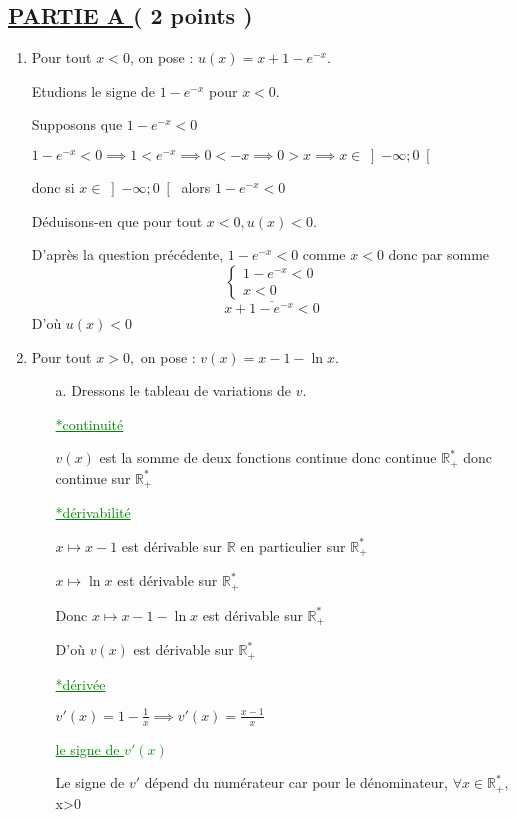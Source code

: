 \documentclass[12pt]{article}
\begin{document}
\subsection*{ \underline{PARTIE A } ( 2 points ) }
\begin{enumerate}
\item Pour tout $x < 0$, on pose : $u(x)=x+1-e^{-x}$.

Etudions le signe de $1-e^{-x}$ pour $x < 0$.

Supposons que $1-e^{-x} < 0$

$ 1-e^{-x} < 0 \implies 1 < e^{-x} \implies 0 < -x \implies 0 > x \implies x\in \left]  -\infty; 0\right[  $

donc si $x\in \left]  -\infty; 0\right[$ alors $1-e^{-x} < 0$

Déduisons-en que pour tout $x < 0, u(x) < 0 $.

D'après la question précédente, $1-e^{-x} < 0$ comme $x < 0$ donc par somme
\[
\underline{\begin{cases}
1-e^{-x} < 0\\
x < 0
\end{cases}}
\]
\[x+1-e^{-x} < 0\]
D'où $ u(x) < 0 $
\item Pour tout $x > 0,$ on pose : $v(x)=x-1-\ln x$.
\begin{enumerate}
\item[a.] Dressons le tableau de variations de $v$.


\textcolor{green}{\underline{*continuité}}

$v(x)$ est la somme de deux fonctions continue donc continue $\mathbb{R}^{*}_{+}$ donc continue sur $\mathbb{R}^{*}_{+}$

\textcolor{green}{\underline{*dérivabilité}}

$x\mapsto x-1$ est dérivable sur $\mathbb{R}$ en particulier sur $\mathbb{R}^{*}_{+}$

$x\mapsto \ln x$ est dérivable sur $\mathbb{R}^{*}_{+}$

Donc $x\mapsto x-1-\ln x$ est dérivable sur $\mathbb{R}^{*}_{+}$

D'où $v(x)$ est dérivable sur $\mathbb{R}^{*}_{+}$

\textcolor{green}{\underline{*dérivée}}

$v'(x)=1-\frac{1}{x} \implies v'(x)=\frac{x-1}{x}$

\textcolor{green}{\underline{le signe de $v'(x)$}}

Le signe de  $v'$ dépend du numérateur car pour le dénominateur, $\forall x\in \mathbb{R}^{*}_{+}$, x>0
 

\end{enumerate}
\end{enumerate}
\end{document}

